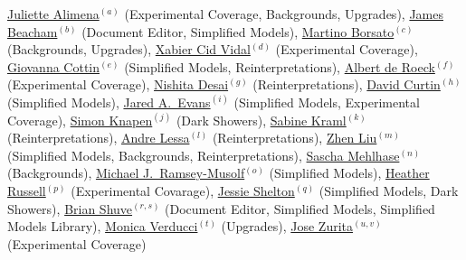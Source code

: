 \noindent  \href{mailto:juliette.alimena@cern.ch}{Juliette Alimena}$^{(a)}$ (Experimental Coverage, Backgrounds, Upgrades), \href{mailto:j.beacham@cern.ch}{James Beacham}$^{(b)}$ (Document Editor, Simplified Models), \href{mailto:martino.borsato@cern.ch}{Martino Borsato}$^{(c)}$ (Backgrounds, Upgrades), \href{mailto:xabier.cid.vidal@cern.ch}{Xabier Cid Vidal}$^{(d)}$ (Experimental Coverage), \href{mailto:gcottin@phys.ntu.edu.tw}{Giovanna Cottin}$^{(e)}$ (Simplified Models, Reinterpretations), \href{mailto:deroeck@mail.cern.ch}{Albert de Roeck}$^{(f)}$ (Experimental Coverage), \href{mailto:ddesai@theory.tifr.res.in}{Nishita Desai}$^{(g)}$ (Reinterpretations), \href{mailto:dcurtin@physics.utoronto.ca}{David Curtin}$^{(h)}$ (Simplified Models), \href{mailto:jaredaevans@gmail.com}{Jared A.~Evans}$^{(i)}$ (Simplified Models, Experimental Coverage), \href{mailto:knapen@ias.edu}{Simon Knapen}$^{(j)}$ (Dark Showers), \href{mailto:sabine.kraml@lpsc.in2p3.fr}{Sabine Kraml}$^{(k)}$ (Reinterpretations), \href{mailto:andre.lessa@ufabc.edu.br}{Andre Lessa}$^{(l)}$ (Reinterpretations),  \href{mailto:zliuphys@umd.edu}{Zhen Liu}$^{(m)}$ (Simplified Models, Backgrounds, Reinterpretations), \href{mailto:sascha.mehlhase@cern.ch}{Sascha Mehlhase}$^{(n)}$ (Backgrounds), \href{mailto:mjrm@physics.umass.edu}{Michael J.~Ramsey-Musolf}$^{(o)}$ (Simplified Models),
\href{mailto:hrussell@cern.ch}{Heather Russell}$^{(p)}$ (Experimental Covarage), \href{mailto:sheltonj@illinois.edu}{Jessie Shelton}$^{(q)}$ (Simplified Models, Dark Showers), \href{mailto:bshuve@g.hmc.edu}{Brian Shuve}$^{(r,s)}$ (Document Editor, Simplified Models, Simplified Models Library),  \href{mailto:monica.verducci@cern.ch}{Monica Verducci}$^{(t)}$ (Upgrades), \href{mailto:jose.zurita@kit.edu}{Jose Zurita}$^{(u,v)}$ (Experimental Coverage)

\vspace{0.5cm}

